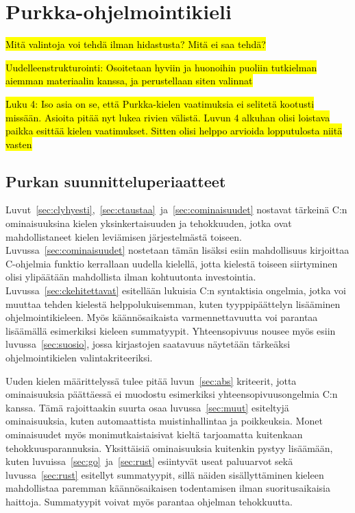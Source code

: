 \section{Purkka-ohjelmointikieli}
\label{sec:purkka}

\hl{Mitä valintoja voi tehdä ilman hidastusta? Mitä ei saa tehdä?}

\hl{Uudelleenstrukturointi: Osoitetaan hyviin ja huonoihin puoliin tutkielman
aiemman materiaalin kanssa, ja perustellaan siten valinnat}

\hl{ Luku 4: Iso asia on se, että Purkka-kielen vaatimuksia ei selitetä
kootusti missään. Asioita pitää nyt lukea rivien välistä. Luvun 4 alkuhan olisi
loistava paikka esittää kielen vaatimukset. Sitten olisi helppo arvioida
lopputulosta niitä vasten }

\subsection{Purkan suunnitteluperiaatteet}

Luvut~\ref{sec:clyhyesti},~\ref{sec:ctaustaa}~ja~\ref{sec:cominaisuudet}
nostavat tärkeinä C:n ominaisuuksina kielen yksinkertaisuuden ja tehokkuuden,
jotka ovat mahdollistaneet kielen leviämisen järjestelmästä toiseen.
Luvussa~\ref{sec:cominaisuudet} nostetaan tämän lisäksi esiin mahdollisuus
kirjoittaa C-ohjelmia funktio kerrallaan uudella kielellä, jotta kielestä
toiseen siirtyminen olisi ylipäätään mahdollista ilman kohtuutonta
investointia. Luvussa~\ref{sec:ckehitettavat} esitellään lukuisia C:n
syntaktisia ongelmia, jotka voi muuttaa tehden kielestä helppolukuisemman,
kuten tyyppipäättelyn lisääminen ohjelmointikieleen. Myös käännösaikaista
varmennettavuutta voi parantaa lisäämällä esimerkiksi kieleen summatyypit.
Yhteensopivuus nousee myös esiin luvussa~\ref{sec:suosio}, jossa kirjastojen
saatavuus näytetään tärkeäksi ohjelmointikielen valintakriteeriksi.

Uuden kielen määrittelyssä tulee pitää luvun~\ref{sec:abs} kriteerit, jotta
ominaisuuksia päättäessä ei muodostu esimerkiksi yhteensopivuusongelmia C:n
kanssa. Tämä rajoittaakin suurta osaa luvussa~\ref{sec:muut} esiteltyjä
ominaisuuksia, kuten automaattista muistinhallintaa ja poikkeuksia. Monet
ominaisuudet myös monimutkaistaisivat kieltä tarjoamatta kuitenkaan
tehokkuusparannuksia. Yksittäisiä ominaisuuksia kuitenkin pystyy lisäämään,
kuten luvuissa~\ref{sec:go}~ja~\ref{sec:rust} esiintyvät useat paluuarvot sekä
luvussa~\ref{sec:rust} esitellyt summatyypit, sillä näiden sisällyttäminen
kieleen mahdollistaa paremman käännösaikaisen todentamisen ilman
suoritusaikaisia haittoja. Summatyypit voivat myös parantaa ohjelman
tehokkuutta.

